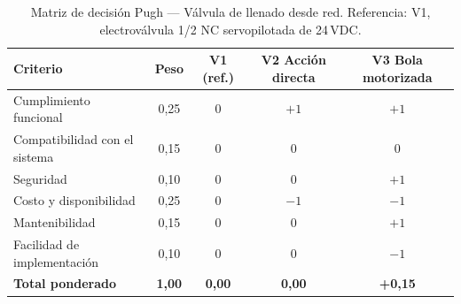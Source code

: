 \begin{table}[H]
\centering
\caption{Matriz de decisión Pugh --- Válvula de llenado desde red. Referencia: V1, electroválvula 1/2\textquotedbl{} NC servopilotada de 24\,VDC.}
\label{tab:pugh-valvula-llenado}
\begin{tabularx}{\textwidth}{Xcccc}
\toprule
\textbf{Criterio} & \textbf{Peso} & \textbf{V1 (ref.)} & \textbf{V2 Acción directa} & \textbf{V3 Bola motorizada} \\
\midrule
Cumplimiento funcional        & 0,25 & 0 & $+1$ & $+1$ \\
Compatibilidad con el sistema & 0,15 & 0 & 0    & 0 \\
Seguridad                     & 0,10 & 0 & 0    & $+1$ \\
Costo y disponibilidad        & 0,25 & 0 & $-1$ & $-1$ \\
Mantenibilidad                & 0,15 & 0 & 0    & $+1$ \\
Facilidad de implementación   & 0,10 & 0 & 0    & $-1$ \\
\midrule
\textbf{Total ponderado}      & \textbf{1,00} & \textbf{0,00} & \textbf{0,00} & \textbf{+0,15} \\
\bottomrule
\end{tabularx}
\end{table}
